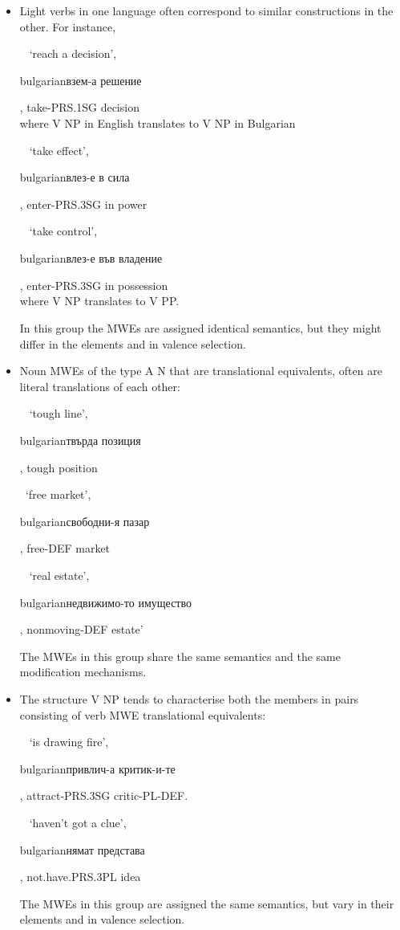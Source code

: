 \documentclass[output=paper]{langsci/langscibook}
\begin{document}
\begin{itemize}
\item Light verbs in one language often correspond to similar constructions
in the other. For instance,

\verb+ + `reach a decision', \begin{otherlanguage*}{bulgarian}взем-а
решение\end{otherlanguage*}, take-\textsc{PRS.1SG} decision\\ where V NP
in English translates to V NP in Bulgarian

\verb+ + `take effect',  \begin{otherlanguage*}{bulgarian}влез-е в
сила\end{otherlanguage*}, enter-\textsc{PRS.3SG} in power 

\verb+ + `take control', \begin{otherlanguage*}{bulgarian}влез-е във
владение\end{otherlanguage*}, enter-\textsc{PRS.3SG}  in possession\\
where V NP translates to V PP.

In this group the MWEs are assigned identical semantics, but they might
differ in the elements and in valence selection.

\item Noun MWEs of the type A N that are translational equivalents,
often are literal translations of each other:

\verb+ + `tough line', \begin{otherlanguage*}{bulgarian}твърда
позиция\end{otherlanguage*}, tough position

\verb+ +`free market', \begin{otherlanguage*}{bulgarian}свободни-я
пазар\end{otherlanguage*}, free-\textsc{DEF} market

\verb+ + `real estate',
\begin{otherlanguage*}{bulgarian}недвижимо-то
имущество\end{otherlanguage*}, nonmoving-\textsc{DEF} estate'

The MWEs in this group share the same semantics and the same modification
mechanisms.

\item The structure V NP tends to characterise both the members in pairs consisting of verb
MWE translational equivalents:

\verb+ + `is drawing fire',
\begin{otherlanguage*}{bulgarian}привлич-а
критик-и-те\end{otherlanguage*}, attract-\textsc{PRS.3SG} critic-\textsc{PL-DEF}.

\verb+ + `haven't got a clue', \begin{otherlanguage*}{bulgarian}нямат
представа\end{otherlanguage*}, not.have.\textsc{PRS.3PL} idea

The MWEs in this group are assigned the same semantics, but vary in
their elements and in valence selection.
\end{itemize}
\end{document}
